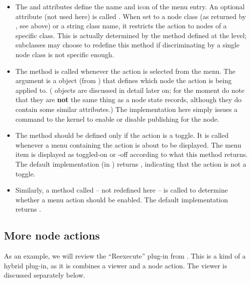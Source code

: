 \documentclass[12pt,twoside]{book}
\begin{document}
  \begin{itemize}
  
  \item The  and  attributes define the name and icon of
  the menu entry. An optional attribute (not used here) is called
  . When set to a node class (as returned by
  , see above) or a string class name, it restricts the
  action to nodes of a specific class. This is actually determined by the
   method defined at the  level;
  subclasses may choose to redefine this method if discriminating by a single 
  node class is not specific enough.

  \item The  method is called whenever the action is selected 
  from the menu. The  argument is a  object (from
  ) that defines which node the action is being applied to.
  ( objects are discussed in detail later on; for the moment do note
  that they are {\bf not} the same thing as a node state records, although they
  do contain some similar attributes.) The implementation here simply issues a
  command to the kernel to enable or disable publishing for the node. 

  \item The  method should be defined only if the action is a
  toggle. It is called whenever a menu containing the action is about to be
  displayed. The menu item is displayed as toggled-on or -off according to what
  this method returns. The default implementation (in ) returns
  , indicating that the action is not a toggle.

  \item Similarly, a method called  -- not redefined here --
  is called to determine whether a menu action should be enabled. The default
  implementation returns .

  \end{itemize}

\subsection{More node actions}

  As an example, we will review the ``Reexecute'' plug-in from
  . This is a kind of a hybrid plug-in, as it is
  combines a viewer and a node action. The viewer is discussed separately below.
\end{document}
